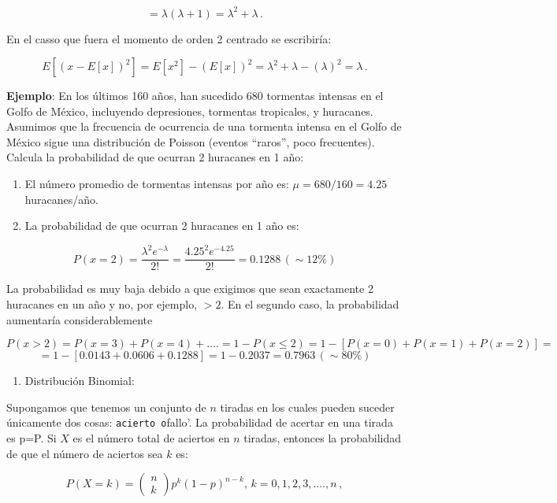 \documentclass[
]{agujournal2019}
\providecommand{\tightlist}{%
  \setlength{\itemsep}{0pt}\setlength{\parskip}{0pt}}\usepackage{longtable,booktabs,array}
\begin{document}
\[=\lambda (\lambda +1)=\lambda^2 + \lambda\,.\]

En el casso que fuera el momento de orden 2 centrado se escribiría:

\[E[(x-E[x])^2]=E[x^2]-(E[x])^2=\lambda^2 + \lambda - (\lambda)^2=\lambda\,.\]

\vspace{0.25cm}

\textbf{Ejemplo}: En los últimos 160 años, han sucedido 680 tormentas
intensas en el Golfo de México, incluyendo depresiones, tormentas
tropicales, y huracanes. Asumimos que la frecuencia de ocurrencia de una
tormenta intensa en el Golfo de México sigue una distribución de Poisson
(eventos ``raros'', poco frecuentes). Calcula la probabilidad de que
ocurran 2 huracanes en 1 año:\\

\begin{enumerate}
\def\labelenumi{(\alph{enumi})}
\item
  El número promedio de tormentas intensas por año es:
  \(\mu=680/160=4.25\) huracanes/año.
\item
  La probabilidad de que ocurran 2 huracanes en 1 año es:
\end{enumerate}

\[P(x=2)=\frac{{\lambda}^2 e^{-\lambda}}{2!}=\frac{{4.25}^2 e^{-4.25}}{2!}=0.1288\,(\sim12\%)\]

La probabilidad es muy baja debido a que exigimos que sean exactamente 2
huracanes en un año y no, por ejemplo, \(>2\). En el segundo caso, la
probabilidad aumentaría considerablemente

\[P(x>2)=P(x=3)+P(x=4)+....=1-P(x\le 2)=1-[P(x=0)+P(x=1)+P(x=2)]=\]
\[=1-[0.0143+0.0606+0.1288]=1-0.2037=0.7963\,(\sim80\%)\]

\vspace{0.5cm}

\begin{enumerate}
\def\labelenumi{\arabic{enumi}.}
\setcounter{enumi}{3}
\tightlist
\item
  Distribución Binomial:
\end{enumerate}

Supongamos que tenemos un conjunto de \(n\) tiradas en los cuales pueden
suceder únicamente dos cosas:
\texttt{acierto\textquotesingle{}\ o}fallo'. La probabilidad de acertar
en una tirada es p=P. Si \(X\) es el número total de aciertos en \(n\)
tiradas, entonces la probabilidad de que el número de aciertos sea \(k\)
es:

\[P(X=k)=\left( \begin{array}{c}
 n \\ k
       \end{array} \right)
p^k (1-p)^{n-k}, \, k=0,1,2,3,....,n\,,\]
\end{document}
